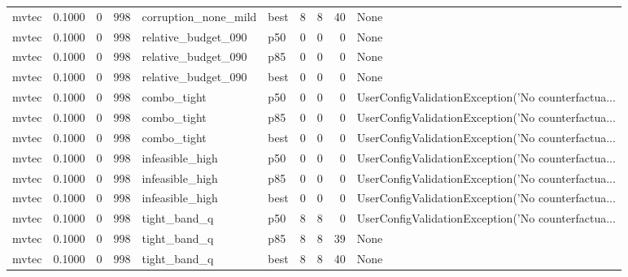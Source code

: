 \begin{tabular}{lrrrllrrrl}
   mvtec &    0.1000 &    0 &    998 & corruption\_none\_mild &   best &               8 &          8 &      40 &                                               None \\
   mvtec &    0.1000 &    0 &    998 &  relative\_budget\_090 &    p50 &               0 &          0 &       0 &                                               None \\
   mvtec &    0.1000 &    0 &    998 &  relative\_budget\_090 &    p85 &               0 &          0 &       0 &                                               None \\
   mvtec &    0.1000 &    0 &    998 &  relative\_budget\_090 &   best &               0 &          0 &       0 &                                               None \\
   mvtec &    0.1000 &    0 &    998 &          combo\_tight &    p50 &               0 &          0 &       0 & UserConfigValidationException('No counterfactua... \\
   mvtec &    0.1000 &    0 &    998 &          combo\_tight &    p85 &               0 &          0 &       0 & UserConfigValidationException('No counterfactua... \\
   mvtec &    0.1000 &    0 &    998 &          combo\_tight &   best &               0 &          0 &       0 & UserConfigValidationException('No counterfactua... \\
   mvtec &    0.1000 &    0 &    998 &      infeasible\_high &    p50 &               0 &          0 &       0 & UserConfigValidationException('No counterfactua... \\
   mvtec &    0.1000 &    0 &    998 &      infeasible\_high &    p85 &               0 &          0 &       0 & UserConfigValidationException('No counterfactua... \\
   mvtec &    0.1000 &    0 &    998 &      infeasible\_high &   best &               0 &          0 &       0 & UserConfigValidationException('No counterfactua... \\
   mvtec &    0.1000 &    0 &    998 &         tight\_band\_q &    p50 &               8 &          8 &       0 & UserConfigValidationException('No counterfactua... \\
   mvtec &    0.1000 &    0 &    998 &         tight\_band\_q &    p85 &               8 &          8 &      39 &                                               None \\
   mvtec &    0.1000 &    0 &    998 &         tight\_band\_q &   best &               8 &          8 &      40 &                                               None \\

\end{tabular}
